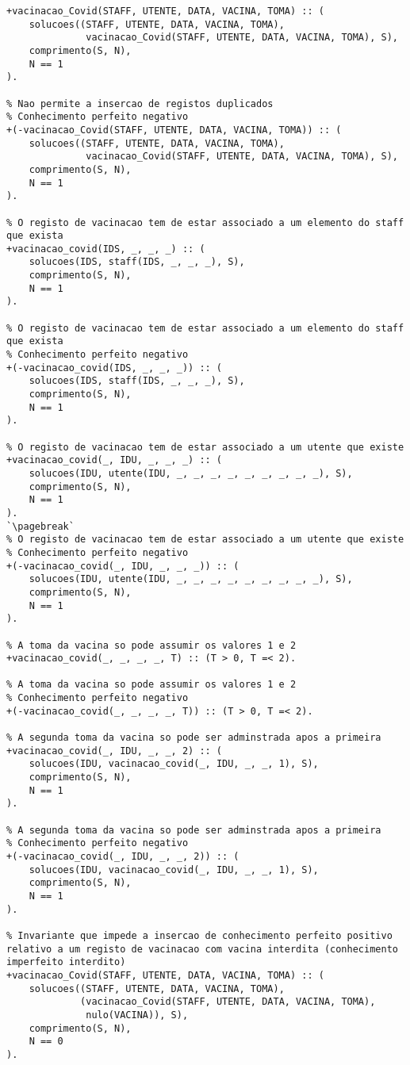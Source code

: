 \begin{lstlisting}[caption={Invariantes de inserção relativos ao predicado \texttt{vacinacao\_covid}}]
% Nao permite a insercao de registos duplicados
+vacinacao_Covid(STAFF, UTENTE, DATA, VACINA, TOMA) :: (
    solucoes((STAFF, UTENTE, DATA, VACINA, TOMA),
              vacinacao_Covid(STAFF, UTENTE, DATA, VACINA, TOMA), S),
    comprimento(S, N),
    N == 1
).

% Nao permite a insercao de registos duplicados
% Conhecimento perfeito negativo
+(-vacinacao_Covid(STAFF, UTENTE, DATA, VACINA, TOMA)) :: (
    solucoes((STAFF, UTENTE, DATA, VACINA, TOMA),
              vacinacao_Covid(STAFF, UTENTE, DATA, VACINA, TOMA), S),
    comprimento(S, N),
    N == 1
).

% O registo de vacinacao tem de estar associado a um elemento do staff que exista
+vacinacao_covid(IDS, _, _, _) :: (
    solucoes(IDS, staff(IDS, _, _, _), S),
    comprimento(S, N),
    N == 1
).

% O registo de vacinacao tem de estar associado a um elemento do staff que exista
% Conhecimento perfeito negativo
+(-vacinacao_covid(IDS, _, _, _)) :: (
    solucoes(IDS, staff(IDS, _, _, _), S),
    comprimento(S, N),
    N == 1
).

% O registo de vacinacao tem de estar associado a um utente que existe
+vacinacao_covid(_, IDU, _, _, _) :: (
    solucoes(IDU, utente(IDU, _, _, _, _, _, _, _, _, _), S),
    comprimento(S, N),
    N == 1
).
`\pagebreak`
% O registo de vacinacao tem de estar associado a um utente que existe
% Conhecimento perfeito negativo
+(-vacinacao_covid(_, IDU, _, _, _)) :: (
    solucoes(IDU, utente(IDU, _, _, _, _, _, _, _, _, _), S),
    comprimento(S, N),
    N == 1
).

% A toma da vacina so pode assumir os valores 1 e 2
+vacinacao_covid(_, _, _, _, T) :: (T > 0, T =< 2).

% A toma da vacina so pode assumir os valores 1 e 2
% Conhecimento perfeito negativo
+(-vacinacao_covid(_, _, _, _, T)) :: (T > 0, T =< 2).

% A segunda toma da vacina so pode ser adminstrada apos a primeira
+vacinacao_covid(_, IDU, _, _, 2) :: (
    solucoes(IDU, vacinacao_covid(_, IDU, _, _, 1), S),
    comprimento(S, N),
    N == 1
).

% A segunda toma da vacina so pode ser adminstrada apos a primeira
% Conhecimento perfeito negativo
+(-vacinacao_covid(_, IDU, _, _, 2)) :: (
    solucoes(IDU, vacinacao_covid(_, IDU, _, _, 1), S),
    comprimento(S, N),
    N == 1
).

% Invariante que impede a insercao de conhecimento perfeito positivo relativo a um registo de vacinacao com vacina interdita (conhecimento imperfeito interdito)
+vacinacao_Covid(STAFF, UTENTE, DATA, VACINA, TOMA) :: (
    solucoes((STAFF, UTENTE, DATA, VACINA, TOMA),
             (vacinacao_Covid(STAFF, UTENTE, DATA, VACINA, TOMA),
              nulo(VACINA)), S),
    comprimento(S, N),
    N == 0
).

\end{lstlisting}

